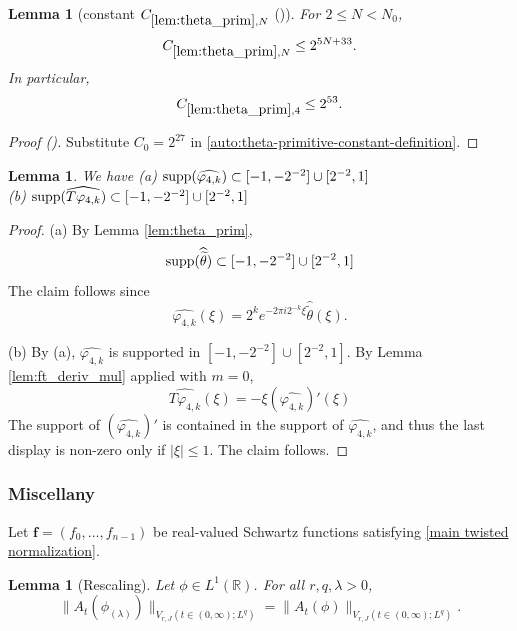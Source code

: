 \documentclass[12pt,reqno]{amsart}
\newcommand{\auto}{{({\tiny\faCar})}}
\theoremstyle{plain}
\newtheorem{lemma}[theorem]{Lemma}
\numberwithin{equation}{section}
\theoremstyle{remark}
\newcommand{\using}[1]{}
\begin{document}
\begin{lemma}[constant $C_{\ref{lem:theta_prim},N}$ \auto]\label{constant theta primitive}\using{lem:theta_prim}
For $2\le N<N_0$,
\begin{equation}\label{constant theta primitive bound}
C_{\ref{lem:theta_prim},N}\le2^{5N+33}.
\end{equation}
In particular,
\begin{equation}\label{auto:constant-theta-primitive-four}
C_{\ref{lem:theta_prim},4}\le2^{53}.
\end{equation}
\end{lemma}
\begin{proof}[Proof \auto]
Substitute $C_0=2^{27}$ in \eqref{auto:theta-primitive-constant-definition}.
\end{proof}


\begin{lemma}\label{lem:phi4_supp}\using{lem:theta_prim}\using{lem:ft_deriv_mul} We have
(a) $\textup{supp}(\widehat{\varphi_{4,k}})
\subset  [-1,-2^{-2}]\cup [2^{-2},1]$\\

(b) $\textup{supp}(\widehat{T\varphi_{4,k}})
\subset  [-1,-2^{-2}]\cup [2^{-2},1]$
\end{lemma}
\begin{proof}
(a) By Lemma \ref{lem:theta_prim},
\[\textup{supp}(\widehat{\widetilde{\theta}}) \subset [-1,-2^{-2}]\cup [2^{-2},1]\]
The claim follows since
\[\widehat{\varphi_{4,k}}(\xi)=2^ke^{-2\pi i2^{-k}\xi}\widehat{\widetilde\theta}(\xi).  \]

(b) By (a), $\widehat{\varphi_{4,k}}$ is supported in
$ [-1,-2^{-2}]\cup [2^{-2},1] $.
  By Lemma \ref{lem:ft_deriv_mul} applied with $m=0$,
  \[\widehat{T\varphi_{4,k}}(\xi) = -\xi(\widehat{\varphi_{4,k}})'(\xi) \]
The support of $(\widehat{\varphi_{4,k}})'$ is contained in the support of $\widehat{\varphi_{4,k}}$, and thus the last display is non-zero only if  $|\xi|\le 1$. The claim follows.
\end{proof}

\subsubsection{Miscellany}
Let $\mathbf{f}=(f_0,\dots,f_{n-1})$ be real-valued Schwartz functions satisfying \eqref{main twisted normalization}.


\begin{lemma}[Rescaling]\label{lem:rescaling}Let $\phi\in L^1(\mathbb{R})$.
For all $r,q,\lambda>0$,
\begin{equation}\label{auto:variation-rescaling-invariance} \|A_t({\phi_{(\lambda)}})\|_{V_{r,J}(t\in (0,\infty); L^q)} =  \|A_t({\phi})\|_{V_{r,J}(t\in (0,\infty); L^q)}. \end{equation}
\end{lemma}
\end{document}
